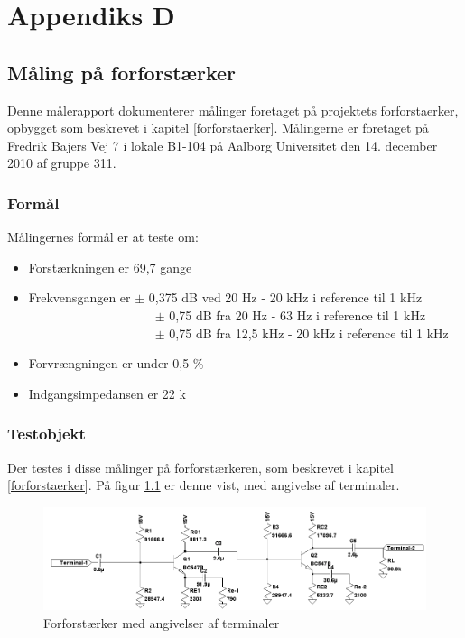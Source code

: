 %
%
\chapter{Appendiks D}
\label{maaleforforstaerker}
\section*{Måling på forforstærker}
Denne målerapport dokumenterer målinger foretaget på projektets forforstaerker, opbygget som beskrevet i kapitel \ref{forforstaerker}. Målingerne er foretaget på Fredrik Bajers Vej 7 i lokale B1-104 på Aalborg Universitet den 14. december 2010 af gruppe 311.

\subsection*{Formål}
Målingernes formål er at teste om:
\begin{itemize}
\item Forstærkningen er 69,7 gange
\item Frekvensgangen er $\pm$ 0,375 dB ved 20 Hz - 20 kHz i reference til 1 kHz
\subitem ~~~~~~~~~~~~~~~~~~~~$\pm$ 0,75 dB fra 20 Hz - 63 Hz i reference til 1 kHz
\subitem ~~~~~~~~~~~~~~~~~~~~$\pm$ 0,75 dB fra 12,5 kHz - 20 kHz i reference til 1 kHz
\item Forvrængningen er under 0,5 \%
\item Indgangsimpedansen er 22 k\ohm 
\end{itemize}

\subsection*{Testobjekt}
Der testes i disse målinger på forforstærkeren, som beskrevet i kapitel \ref{forforstaerker}. På figur \ref{fig:testob_forforstaerker} er denne vist, med angivelse af terminaler.

\begin{figure}[h]
\centering
\includegraphics[scale=0.42]{maalerapporter/forforstaerker/testobjekt-forforstaerker.png}
\caption{Forforstærker med angivelser af terminaler}
\label{fig:testob_forforstaerker}
\end{figure}

